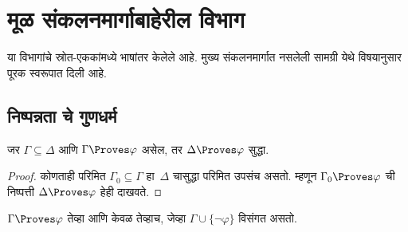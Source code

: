 \chapter{मूळ संकलनमार्गाबाहेरील विभाग}\label{supp:chap}
या विभागांचे स्रोत-एककांमध्ये भाषांतर केलेले आहे. मुख्य संकलनमार्गात नसलेली सामग्री येथे विषयानुसार पूरक स्वरूपात दिली आहे.












\section{निष्पन्नता चे गुणधर्म}\label{fol:axd:prv-alt:sec}

\begin{prop}[एकस्वनिकता] जर $\Gamma \subseteq \Delta$ आणि $\Gamma \Proves \varphi$
असेल, तर $\Delta \Proves \varphi$ सुद्धा. \end{prop}

\begin{proof} कोणताही परिमित $\Gamma_0 \subseteq \Gamma$ हा~$\Delta$ चासुद्धा
परिमित उपसंच असतो. म्हणून $\Gamma_0 \Proves \varphi$ ची निष्पत्ती
$\Delta \Proves \varphi$ हेही दाखवते. \end{proof}

\begin{prop}\label{fol:axd:prv-alt:prop:provability} $\Gamma \Proves \varphi$ तेव्हा आणि केवळ
तेव्हाच, जेव्हा $\Gamma\cup \{\lnot\varphi \}$ विसंगत असतो. \end{prop}

